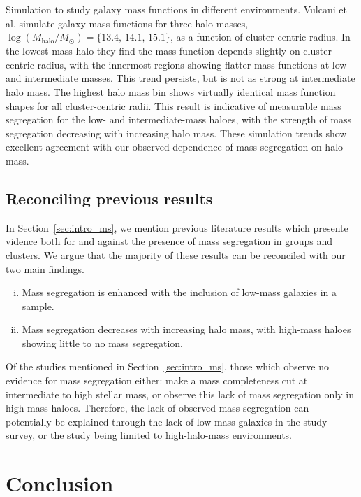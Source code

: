 Simulation \citep{springel2005} to study galaxy mass functions in
different environments.  Vulcani et al. simulate galaxy mass functions
for three halo masses, $\log(M_\mathrm{halo}/M_\odot) =
\{13.4,\,14.1,\,15.1\}$, as a function of cluster-centric radius.  In
the lowest mass halo they find the mass function depends slightly on
cluster-centric radius, with the innermost regions showing flatter
mass functions at low and intermediate masses.  This trend persists,
but is not as strong at intermediate halo mass.  The highest halo mass
bin shows virtually identical mass function shapes for all
cluster-centric radii.  This result is indicative of measurable mass
segregation for the low- and intermediate-mass haloes, with the
strength of mass segregation decreasing with increasing halo mass.
These simulation trends show excellent agreement with our observed
dependence of mass segregation on halo mass.

\subsection{Reconciling previous results}

In Section~\ref{sec:intro_ms}, we mention previous literature results
which presente vidence both for and against the presence of mass
segregation in groups and clusters.  We argue that the majority of
these results can be reconciled with our two main findings.

\begin{enumerate}[(i)]
  \item Mass segregation is enhanced with the inclusion of low-mass
    galaxies in a sample.

  \item Mass segregation decreases with increasing halo mass, with
    high-mass haloes showing little to no mass segregation.
\end{enumerate}

\noindent
Of the studies mentioned in Section~\ref{sec:intro_ms}, those which
observe no evidence for mass segregation either:  make a mass
completeness cut at intermediate to high stellar mass, or observe this
lack of mass segregation only in high-mass haloes.  Therefore, the
lack of observed mass segregation can potentially be explained through
the lack of low-mass galaxies in the study survey, or the study being
limited to high-halo-mass environments.

\section{Conclusion}
\label{sec:conclusion_ms}

